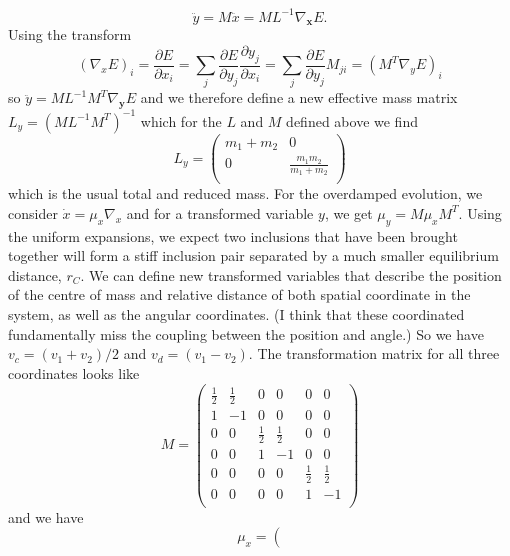 {\begin{equation}
    \ddot{y}=M \ddot{x}=M L^{-1}\nabla_{\mathbf{x}}E.
\end{equation}
Using the transform 
\begin{equation}
    (\nabla_x E)_i = \frac{\partial E}{\partial x_i} = \sum_j \frac{\partial E}{\partial y_j}\frac{\partial y_j}{\partial x_i} = \sum_j \frac{\partial E}{\partial y_j} M_{ji} = (M^T \nabla_y E)_i
\end{equation}
so $\ddot{y}= M L^{-1} M^T\nabla_{\mathbf{y}}E$ and we therefore define a new effective mass matrix $L_y = (M L^{-1} M^T)^{-1}$ which for the $L$ and $M$ defined above we find
\begin{equation}
    L_y = \left(
\begin{array}{cc}
 m_1+m_2 & 0 \\
 0 & \frac{m_1 m_2}{m_1+m_2} \\
\end{array}
\right)
\end{equation}
which is the usual total and reduced mass. For the overdamped evolution, we consider $\dot{x}=\mu_x\nabla_x$ and for a transformed variable $y$, we get $\mu_y = M\mu_xM^T$. Using the uniform expansions, we expect two inclusions that have been brought together will form a stiff inclusion pair separated by a much smaller equilibrium distance, $r_C$. We can define new transformed variables that describe the position of the centre of mass and relative distance of both spatial coordinate in the system, as well as the angular coordinates. (I think that these coordinated fundamentally miss the coupling between the position and angle.) So we have $v_c = (v_1 + v_2)/2$ and $v_d = (v_1 - v_2)$. The transformation matrix for all three coordinates looks like    
\begin{equation}
    M = \left(
\begin{array}{cccccc}
 \frac{1}{2} & \frac{1}{2} & 0 & 0 & 0 & 0 \\
 1 & -1 & 0 & 0 & 0 & 0 \\
 0 & 0 & \frac{1}{2} & \frac{1}{2} & 0 & 0 \\
 0 & 0 & 1 & -1 & 0 & 0 \\
 0 & 0 & 0 & 0 & \frac{1}{2} & \frac{1}{2} \\
 0 & 0 & 0 & 0 & 1 & -1 \\
\end{array}
\right)
\end{equation}
and we have
\begin{equation}
    \mu_x = \left(

\end{equation}}

